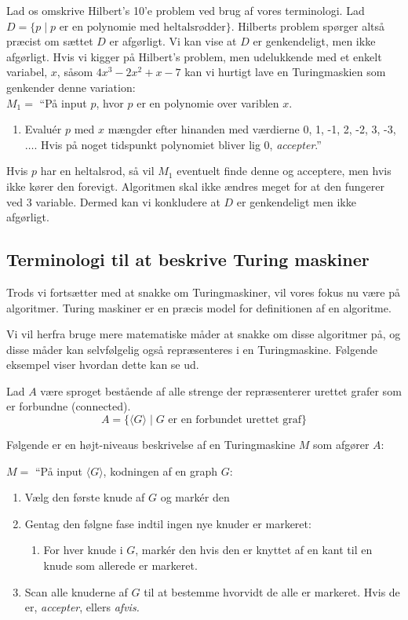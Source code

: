 Lad os omskrive Hilbert's 10'e problem ved brug af vores terminologi. Lad $D = \{p \mid p \text{ er en polynomie med heltalsrødder}\}.$ Hilberts problem spørger altså præcist om sættet $D$ er afgørligt. Vi kan vise at $D$ er genkendeligt, men ikke afgørligt. Hvis vi kigger på Hilbert's problem, men udelukkende med et enkelt variabel, $x$, såsom $4x^{3}-2x^{2}+x-7$ kan vi hurtigt lave en Turingmaskien som genkender denne variation:\\
\noindent
$M_{1} = $ ``På input $p$, hvor $p$ er en polynomie over variblen $x$.
\begin{enumerate}
  \item Evaluér $p$ med $x$ mængder efter hinanden med værdierne 0, 1, -1, 2, -2, 3, -3, $\ldots$. Hvis på noget tidspunkt polynomiet bliver lig 0, \textit{accepter}.''
\end{enumerate}

Hvis $p$ har en heltalsrod, så vil $M_{1}$ eventuelt finde denne og acceptere, men hvis ikke kører den forevigt. Algoritmen skal ikke ændres meget for at den fungerer ved 3 variable. Dermed kan vi konkludere at $D$ er genkendeligt men ikke afgørligt.

\subsection{Terminologi til at beskrive Turing maskiner}%
\label{subsec:terminologiTuringmaskiner}

Trods vi fortsætter med at snakke om Turingmaskiner, vil vores fokus nu være på algoritmer. Turing maskiner er en præcis model for definitionen af en algoritme.

Vi vil herfra bruge mere matematiske måder at snakke om disse algoritmer på, og disse måder kan selvfølgelig også repræsenteres i en Turingmaskine. Følgende eksempel viser hvordan dette kan se ud.

Lad $A$ være sproget bestående af alle strenge der repræsenterer urettet grafer som er forbundne (connected).
\begin{equation*}
A = \{\langle G \rangle \mid G \text{ er en forbundet urettet graf}\}
\end{equation*}

Følgende er en højt-niveaus beskrivelse af en Turingmaskine $M$ som afgører $A$:

$M = $ ``På input $\langle G \rangle$, kodningen af en graph $G$:
\begin{enumerate}
  \item Vælg den første knude af $G$ og markér den
  \item Gentag den følgne fase indtil ingen nye knuder er markeret:
		\begin{enumerate}
		  \item For hver knude i $G$, markér den hvis den er knyttet af en kant til en knude som allerede er markeret.
		\end{enumerate}
  \item Scan alle knuderne af $G$ til at bestemme hvorvidt de alle er markeret. Hvis de er, \textit{accepter}, ellers \textit{afvis.}
\end{enumerate}

